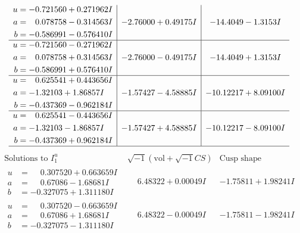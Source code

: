 \documentclass[1p]{elsarticle_modified}
\theoremstyle{definition}
\newcommand{\I}{\sqrt{-1}}
\begin{document}
$$\begin{array}{c|c|c}
\begin{aligned}
u &= -0.721560 + 0.271962 I \\
a &= \phantom{-}0.078758 - 0.314563 I \\
b &= -0.586991 - 0.576410 I\end{aligned}
 & -2.76000 + 0.49175 I & -14.4049 - 1.3153 I \\ \hline\begin{aligned}
u &= -0.721560 - 0.271962 I \\
a &= \phantom{-}0.078758 + 0.314563 I \\
b &= -0.586991 + 0.576410 I\end{aligned}
 & -2.76000 - 0.49175 I & -14.4049 + 1.3153 I \\ \hline\begin{aligned}
u &= \phantom{-}0.625541 + 0.443656 I \\
a &= -1.32103 + 1.86857 I \\
b &= -0.437369 - 0.962184 I\end{aligned}
 & -1.57427 - 4.58885 I & -10.12217 + 8.09100 I \\ \hline\begin{aligned}
u &= \phantom{-}0.625541 - 0.443656 I \\
a &= -1.32103 - 1.86857 I \\
b &= -0.437369 + 0.962184 I\end{aligned}
 & -1.57427 + 4.58885 I & -10.12217 - 8.09100 I\\
 \hline 
 \end{array}$$\newpage$$\begin{array}{c|c|c}  
\text{Solutions to }I^u_{1}& \I (\text{vol} + \sqrt{-1}CS) & \text{Cusp shape}\\
 \hline 
\begin{aligned}
u &= \phantom{-}0.307520 + 0.663659 I \\
a &= \phantom{-}0.67086 - 1.68681 I \\
b &= -0.327075 + 1.311180 I\end{aligned}
 & \phantom{-}6.48322 + 0.00049 I & -1.75811 + 1.98241 I \\ \hline\begin{aligned}
u &= \phantom{-}0.307520 - 0.663659 I \\
a &= \phantom{-}0.67086 + 1.68681 I \\
b &= -0.327075 - 1.311180 I\end{aligned}
 & \phantom{-}6.48322 - 0.00049 I & -1.75811 - 1.98241 I \\ \hline\begin{aligned}

\end{aligned}
\end{array}$$
\end{document}
